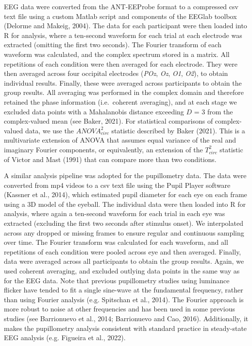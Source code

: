 \documentclass[
]{article}
\begin{document}
EEG data were converted from the ANT-EEProbe format to a compressed csv text file using a custom Matlab script and components of the EEGlab toolbox (Delorme and Makeig, 2004). The data for each participant were then loaded into R for analysis, where a ten-second waveform for each trial at each electrode was extracted (omitting the first two seconds). The Fourier transform of each waveform was calculated, and the complex spectrum stored in a matrix. All repetitions of each condition were then averaged for each electrode. They were then averaged across four occipital electrodes (\emph{POz}, \emph{Oz}, \emph{O1}, \emph{O2}), to obtain individual results. Finally, these were averaged across participants to obtain the group results. All averaging was performed in the complex domain and therefore retained the phase information (i.e.~coherent averaging), and at each stage we excluded data points with a Mahalanobis distance exceeding \(D\) = 3 from the complex-valued mean (see Baker, 2021). For statistical comparisons of complex-valued data, we use the \(ANOVA^2_{circ}\) statistic described by Baker (2021). This is a multivariate extension of ANOVA that assumes equal variance of the real and imaginary Fourier components, or equivalently, an extension of the \(T^2_{circ}\) statistic of Victor and Mast (1991) that can compare more than two conditions.

A similar analysis pipeline was adopted for the pupillometry data. The data were converted from mp4 videos to a csv text file using the Pupil Player software (Kassner et al., 2014), which estimated pupil diameter for each eye on each frame using a 3D model of the eyeball. The individual data were then loaded into R for analysis, where again a ten-second waveform for each trial in each eye was extracted (excluding the first two seconds after stimulus onset). We interpolated across any dropped or missing frames to ensure regular and continuous sampling over time. The Fourier transform was calculated for each waveform, and all repetitions of each condition were pooled across eye and then averaged. Finally, data were averaged across all participants to obtain the group results. Again, we used coherent averaging, and excluded outlying data points in the same way as for the EEG data. Note that previous pupillometry studies using luminance flicker have tended to fit a single sine-wave at the fundamental frequency, rather than using Fourier analysis (e.g. Spitschan et al., 2014). The Fourier approach is more robust to noise at other frequencies and has been used in some previous studies (see Barrionuevo et al., 2014; Barrionuevo and Cao, 2016). Additionally, it makes the pupillometry analysis consistent with standard practice in steady-state EEG analysis (e.g. Figueira et al., 2022).
\end{document}
